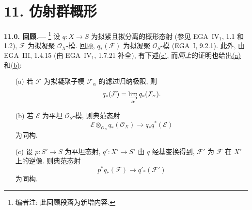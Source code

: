 
\section*{11. 仿射群概形}
\label{sec:sga3-VIB-11}%

\medskip
{}\label{par:sga3-VIB-11.0}%
\noindent\textbf{11.0. 回顾.---}%
\footnote{\label{note:sga3-VIB-104}编者注: 此回顾段落为新增内容.}
设 \(q:X\to S\) 为拟紧且拟分离的概形态射
\textup{(参见 EGA~IV\(_1\), 1.1 和 1.2)},
\(\mathcal F\) 为拟凝聚 \(\mathcal O_X\)-模.
回顾, \(q_*(\mathcal F)\) 为拟凝聚 \(\mathcal O_S\)-模
\textup{(EGA~I, 9.2.1)}.
此外, 由 EGA~III, 1.4.15 \textup{(由 EGA~IV\(_1\), 1.7.21 补全)},
有下述\hyperref[concl:sga3-VIB-11.0-c]{\textup{(c)}},
而\emph{同上}的证明也给出\hyperref[concl:sga3-VIB-11.0-a]{\textup{(a)}}
和\hyperref[concl:sga3-VIB-11.0-b]{\textup{(b)}}:
\begin{enumerate}
\item[\textup{(a)}]\label{concl:sga3-VIB-11.0-a}
  若 \(\mathcal F\) 为拟凝聚子模 \(\mathcal F_\alpha\) 的滤过归纳极限, 则
  \[
    q_*(\mathcal F)
      =\varinjlim_\alpha q_*(\mathcal F_\alpha).
  \]

\item[\textup{\SGAInlineRefTarget{par:sga3-VIB-11.0:item:b}(b)}]\label{concl:sga3-VIB-11.0-b}
  若 \(\mathcal E\) 为平坦 \(\mathcal O_S\)-模, 则典范态射
  \label{form:sga3-VIB-11.0-projection}%
  \[
    \mathcal E\otimes_{\mathcal O_S}q_*(\mathcal O_X)
      \longrightarrow q_*q^*(\mathcal E)
  \]
  为同构.

\item[\textup{(c)}]\label{concl:sga3-VIB-11.0-c}
  设 \(p:S'\to S\) 为平坦态射, \(q':X'\to S'\) 由 \(q\) 经基变换得到,
\(\mathcal F'\) 为 \(\mathcal F\) 在 \(X'\) 上的逆像. 则典范态射
  \label{form:sga3-VIB-11.0-flat-base-change}%
  \[
    p^*q_*(\mathcal F)\longrightarrow q'_*(\mathcal F')
  \]
  为同构.
\end{enumerate}

